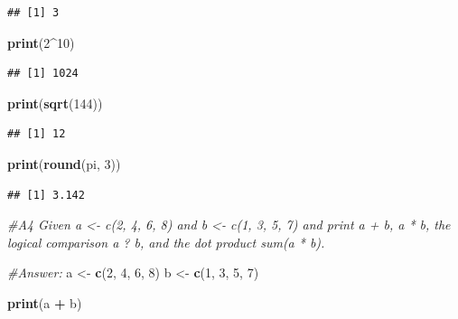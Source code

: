 \documentclass[
]{article}
\newenvironment{Shaded}{\begin{snugshade}}{\end{snugshade}}
\newcommand{\CommentTok}[1]{\textcolor[rgb]{0.56,0.35,0.01}{\textit{#1}}}
\newcommand{\DecValTok}[1]{\textcolor[rgb]{0.00,0.00,0.81}{#1}}
\newcommand{\FunctionTok}[1]{\textcolor[rgb]{0.13,0.29,0.53}{\textbf{#1}}}
\newcommand{\NormalTok}[1]{#1}
\newcommand{\OtherTok}[1]{\textcolor[rgb]{0.56,0.35,0.01}{#1}}
\newcommand{\SpecialCharTok}[1]{\textcolor[rgb]{0.81,0.36,0.00}{\textbf{#1}}}
\begin{document}
\begin{verbatim}
## [1] 3
\end{verbatim}

\begin{Shaded}
\begin{Highlighting}[]
\FunctionTok{print}\NormalTok{(}\DecValTok{2}\SpecialCharTok{\^{}}\DecValTok{10}\NormalTok{)}
\end{Highlighting}
\end{Shaded}

\begin{verbatim}
## [1] 1024
\end{verbatim}

\begin{Shaded}
\begin{Highlighting}[]
\FunctionTok{print}\NormalTok{(}\FunctionTok{sqrt}\NormalTok{(}\DecValTok{144}\NormalTok{))}
\end{Highlighting}
\end{Shaded}

\begin{verbatim}
## [1] 12
\end{verbatim}

\begin{Shaded}
\begin{Highlighting}[]
\FunctionTok{print}\NormalTok{(}\FunctionTok{round}\NormalTok{(pi, }\DecValTok{3}\NormalTok{))}
\end{Highlighting}
\end{Shaded}

\begin{verbatim}
## [1] 3.142
\end{verbatim}

\begin{Shaded}
\begin{Highlighting}[]
\CommentTok{\#A4 Given a \textless{}{-} c(2, 4, 6, 8) and b \textless{}{-} c(1, 3, 5, 7) and print a + b, a * b, the logical comparison a ? b, and the dot product sum(a * b).}

\CommentTok{\#Answer:}
\NormalTok{a }\OtherTok{\textless{}{-}} \FunctionTok{c}\NormalTok{(}\DecValTok{2}\NormalTok{, }\DecValTok{4}\NormalTok{, }\DecValTok{6}\NormalTok{, }\DecValTok{8}\NormalTok{)}
\NormalTok{b }\OtherTok{\textless{}{-}} \FunctionTok{c}\NormalTok{(}\DecValTok{1}\NormalTok{, }\DecValTok{3}\NormalTok{, }\DecValTok{5}\NormalTok{, }\DecValTok{7}\NormalTok{)}

\FunctionTok{print}\NormalTok{(a }\SpecialCharTok{+}\NormalTok{ b)}
\end{Highlighting}
\end{Shaded}
\end{document}
